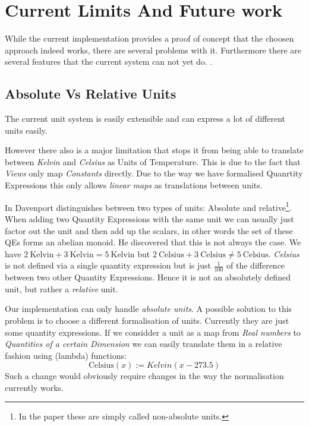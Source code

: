 \section{Current Limits And Future work}
\label{sec:future}

While the current implementation provides a proof of concept that the choosen approach indeed works, there are several problems with it. Furthermore there are several features that the current system can not yet do. 
.

\subsection{Absolute Vs Relative Units}
The current unit system is easily extensible and can express a lot of different units easily.

However there also is a major limitation that stops it from being able to translate between \textit{Kelvin} and \textit{Celsius} as Units of Temperature. This is due to the fact that \textit{Views} only map \textit{Constants} directly. Due to the way we have formalised Quanrtity Expressions this only allows \textit{linear maps} as translations between units.

In \cite{SD:UnitKnowledgeMgmt08} Davenport distinguishes between two types of units: Absolute and relative\footnote{In the paper these are simply called non-absolute units. }. When adding two Quantity Expressions with the same unit we can usually just factor out the unit and then add up the scalars, in other words the set of these QEs forms an abelian monoid. He discovered that this is not always the case. We have $2\ \text{Kelvin} + 3\ \text{Kelvin} = 5\ \text{Kelvin}$ but $2\ \text{Celsius} + 3\ \text{Celsius} \neq 5\ \text{Celsius}$. \textit{Celsius} is not defined via a single quantity expression but is just $\frac{1}{100}$ of the difference between two other Quantity Expressions. Hence it is not an absolutely defined unit, but rather a \textit{relative} unit.

Our implementation can only handle \textit{absolute units}. A possible solution to this problem is to choose a different formalisation of units. Currently they are just some quantity expressions. If we considder a unit as a map from \textit{Real numbers} to \textit{Quantities of a certain Dimension} we can easily translate them in a relative fashion using (lambda) functions:
\[\text{Celsius}(x) := \textit{Kelvin}(x - 273.5)\]
Such a change would obviously require changes in the way the normalisation currently works.

